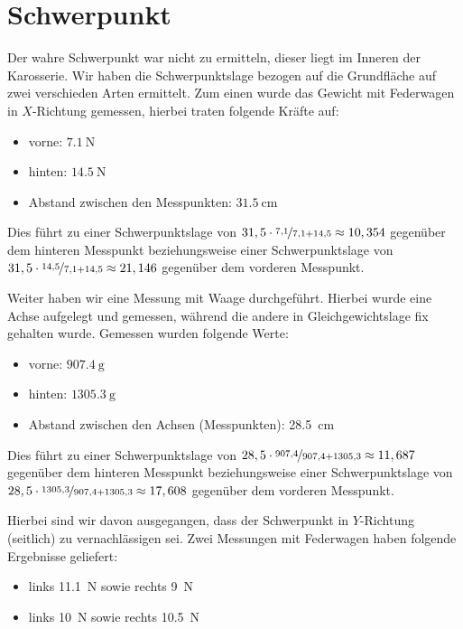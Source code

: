 \documentclass[11pt]{article}
\begin{document}
\section{Schwerpunkt}
    Der wahre Schwerpunkt war nicht zu ermitteln, dieser liegt im Inneren der Karosserie.
    Wir haben die Schwerpunktslage bezogen auf die Grundfläche auf zwei verschieden Arten ermittelt.
    Zum einen wurde das Gewicht mit Federwagen in $X$-Richtung gemessen, hierbei traten folgende Kräfte auf:
    \begin{itemize}
    \item vorne: $\SI{7,1}{\newton}$
    \item hinten: $\SI{14,5}{\newton}$
    \item Abstand zwischen den Messpunkten: $\SI{31,5}{\cm}$
    \end{itemize}
    Dies führt zu einer Schwerpunktslage von $31,5\cdot\nicefrac{7,1}{7,1+14,5} \approx 10,354$ gegenüber dem hinteren Messpunkt beziehungsweise einer Schwerpunktslage von $31,5\cdot\nicefrac{14,5}{7,1+14,5} \approx 21,146$ gegenüber dem vorderen Messpunkt.

    Weiter haben wir eine Messung mit Waage durchgeführt.
    Hierbei wurde eine Achse aufgelegt und gemessen, während die andere in Gleichgewichtslage fix gehalten wurde. Gemessen wurden folgende Werte:
    \begin{itemize}
    \item vorne: $\SI{907,4}{\gram}$
    \item hinten: $\SI{1305,3}{\gram}$
    \item Abstand zwischen den Achsen (Messpunkten): \SI{28,5}{\cm}
    \end{itemize}
    Dies führt zu einer Schwerpunktslage von $28,5\cdot\nicefrac{907,4}{907,4+1305,3} \approx 11,687$ gegenüber dem hinteren Messpunkt beziehungsweise einer Schwerpunktslage von $28,5\cdot\nicefrac{1305,3}{907,4+1305,3} \approx 17,608$ gegenüber dem vorderen Messpunkt.


    Hierbei sind wir davon ausgegangen, dass der Schwerpunkt in $Y$-Richtung (seitlich) zu vernachlässigen sei. Zwei Messungen mit Federwagen haben folgende Ergebnisse geliefert:
    \begin{itemize}
        \item links \SI{11,1}{\newton} sowie rechts \SI{9}{\newton}
        \item links \SI{10}{\newton} sowie rechts \SI{10,5}{\newton}
    \end{itemize}
\end{document}
